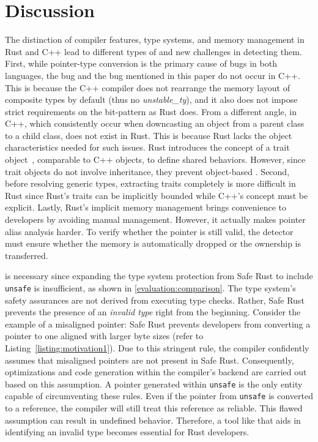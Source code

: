\section{Discussion}

{
The distinction of compiler features, type systems, and memory management in Rust and C++ lead to different types of \bugs and new challenges in detecting them. First, }while pointer-type conversion is the primary cause of bugs in both languages, the \btwo bug and the \bthree bug mentioned in this paper do not occur in C++. This is because the C++ compiler does not rearrange the memory layout of composite types by default (thus no \textit{unstable\_ty}), and it also does not impose strict requirements on the bit-pattern as Rust does.
From a different angle, \bugs in C++, which consistently occur when downcasting an object from a parent class to a child class, does not exist in Rust.
This is because Rust lacks the object characteristics needed for such issues.
Rust introduces the concept of a trait object~\cite{traitobjects}, comparable to C++ objects, to define shared behaviors. However, since trait objects do not involve inheritance, they prevent object-based \bugs.
{Second, before resolving generic types, extracting traits completely is more difficult in Rust since Rust's traits can be implicitly bounded while C++'s concept must be explicit.
Lastly, Rust's implicit memory management brings convenience to developers by avoiding manual management. However, it actually makes pointer alias analysis harder. To verify whether the pointer is still valid, the detector must ensure whether the memory is automatically dropped or the ownership is transferred}.


\vspace{0.05in}
{
\TN is necessary since expanding the type system protection from Safe Rust to include \texttt{unsafe} is insufficient, as shown in \autoref{evaluation:comparison}.
%
The type system's safety assurances are not derived from executing type checks. Rather, Safe Rust prevents the presence of an \textit{invalid type} right from the beginning.
%
Consider the example of a misaligned pointer: Safe Rust prevents developers from converting a pointer to one aligned with larger byte sizes (refer to Listing~\ref{listing:motivation1}). Due to this stringent rule, the compiler confidently assumes that misaligned pointers are not present in Safe Rust. Consequently, optimizations and code generation within the compiler's backend are carried out based on this assumption.
%
A pointer generated within \texttt{unsafe} is the only entity capable of circumventing these rules. 
Even if the pointer from \texttt{unsafe} is converted to a reference, the compiler will still treat this reference as reliable. This flawed assumption can result in undefined behavior. %
Therefore, a tool like \TN that aids in identifying an invalid type becomes essential for Rust developers.
}


